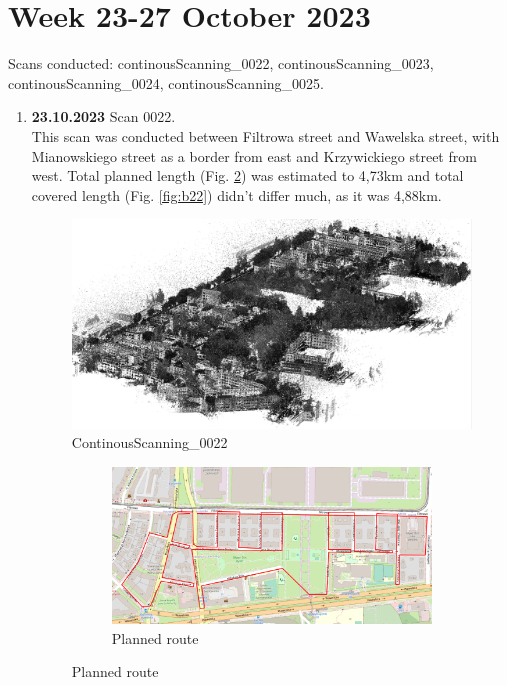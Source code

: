 \documentclass[a4paper,12pt]{book}
\begin{document}
\section{Week 23-27 October 2023}
Scans conducted: continousScanning\_0022, continousScanning\_0023, continousScanning\_0024, continousScanning\_0025.\\
\begin{enumerate}
	\item \textbf{23.10.2023} Scan 0022. \\
	This scan was conducted between Filtrowa street and Wawelska street, with Mianowskiego street as a border from east and Krzywickiego street from west. Total planned length (Fig. \ref{fig:a22}) was estimated to 4,73km and total covered length (Fig. \ref{fig:b22}) didn't differ much, as it was 4,88km.
	\begin{figure}[H]
		\includegraphics[width=1\linewidth]{cloud22}
		\caption{ContinousScanning\_0022}
	\end{figure}
	\pagebreak
	\begin{figure}[H]
		\centering
		\begin{subfigure}{.90\textwidth}
			\centering
			\includegraphics[width=1\linewidth]{route_p22}
			\caption{Planned route}
			\label{fig:a22}

\end{subfigure}
\end{figure}
\end{enumerate}
\end{document}
